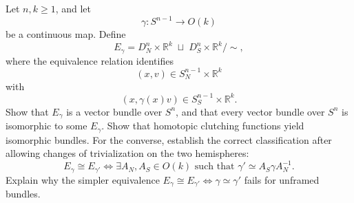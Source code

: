 \begin{problem}
Let \(n,k\ge1\), and let
\[
\gamma:S^{n-1}\longrightarrow O(k)
\]
be a continuous map.
Define
\[
E_{\gamma}
=
D_N^n\times \mathbb{R}^k
\;\sqcup\;
D_S^n\times \mathbb{R}^k
\big/ \sim,
\]
where the equivalence relation identifies
\[
(x,v)\in S_N^{n-1}\times \mathbb{R}^k
\]
with
\[
(x,\gamma(x)v)\in S_S^{n-1}\times \mathbb{R}^k.
\]
Show that \(E_{\gamma}\) is a vector bundle over \(S^n\), and that every vector bundle over \(S^n\) is isomorphic to some \(E_{\gamma}\). Show that homotopic clutching functions yield isomorphic bundles. For the converse, establish the correct classification after allowing changes of trivialization on the two hemispheres:
\[
\boxed{E_{\gamma}\cong E_{\gamma'}
\iff\exists A_N,A_S\in O(k)\text{ such that }
\gamma'\simeq A_S\gamma A_N^{-1}.}
\]
Explain why the simpler equivalence \(E_{\gamma}\cong E_{\gamma'}\iff\gamma\simeq\gamma'\) fails for unframed bundles.
\end{problem}


